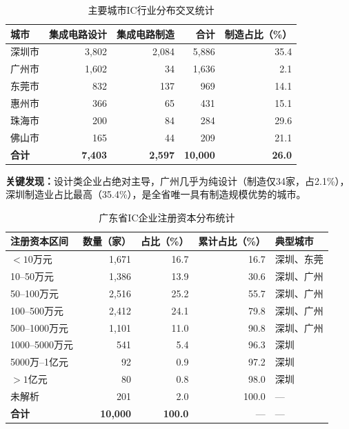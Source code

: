 \documentclass[12pt,a4paper]{ctexart}
\newcommand{\tableHeaderRow}{\rowcolor{tealPrimary}\color{white}}
\newcommand{\tableOddRow}{\rowcolor{mintBG}}
\newcommand{\tableEvenRow}{\rowcolor{white}}
\begin{document}
\begin{table}[H]
\centering
\caption{主要城市IC行业分布交叉统计}
\label{tab:city_industry}
\begin{tabular}{lrrrr}
\toprule
\tableHeaderRow
\textbf{城市} & \textbf{集成电路设计} & \textbf{集成电路制造} & \textbf{合计} & \textbf{制造占比（\%）} \\
\midrule
\tableOddRow  深圳市 & 3,802 & 2,084 & 5,886 & 35.4 \\
\tableEvenRow 广州市 & 1,602 & 34    & 1,636 & 2.1  \\
\tableOddRow  东莞市 & 832   & 137   & 969   & 14.1 \\
\tableEvenRow 惠州市 & 366   & 65    & 431   & 15.1 \\
\tableOddRow  珠海市 & 200   & 84    & 284   & 29.6 \\
\tableEvenRow 佛山市 & 165   & 44    & 209   & 21.1 \\
\midrule
\tableOddRow  \textbf{合计} & \textbf{7,403} & \textbf{2,597} & \textbf{10,000} & \textbf{26.0} \\
\bottomrule
\end{tabular}
\end{table}

\textbf{关键发现：}设计类企业占绝对主导，广州几乎为纯设计（制造仅34家，占2.1\%），
深圳制造业占比最高（35.4\%），是全省唯一具有制造规模优势的城市。

\begin{table}[H]
\centering
\caption{广东省IC企业注册资本分布统计}
\label{tab:capital}
\begin{tabular}{lrrrl}
\toprule
\tableHeaderRow
\textbf{注册资本区间} & \textbf{数量（家）} & \textbf{占比（\%）} & \textbf{累计占比（\%）} & \textbf{典型城市} \\
\midrule
\tableOddRow  $<10$万元    & 1,671 & 16.7 & 16.7  & 深圳、东莞 \\
\tableEvenRow 10--50万元    & 1,386 & 13.9 & 30.6  & 深圳、广州 \\
\tableOddRow  50--100万元   & 2,516 & 25.2 & 55.7  & 深圳、广州 \\
\tableEvenRow 100--500万元  & 2,412 & 24.1 & 79.8  & 深圳、广州 \\
\tableOddRow  500--1000万元 & 1,101 & 11.0 & 90.8  & 深圳、广州 \\
\tableEvenRow 1000--5000万元 & 541  & 5.4  & 96.3  & 深圳      \\
\tableOddRow  5000万--1亿元  & 92   & 0.9  & 97.2  & 深圳      \\
\tableEvenRow $>1$亿元      & 80   & 0.8  & 98.0  & 深圳      \\
\tableOddRow  未解析        & 201  & 2.0  & 100.0 & —        \\
\midrule
\tableEvenRow \textbf{合计} & \textbf{10,000} & \textbf{100.0} & — & — \\
\bottomrule
\end{tabular}
\end{table}
\end{document}
